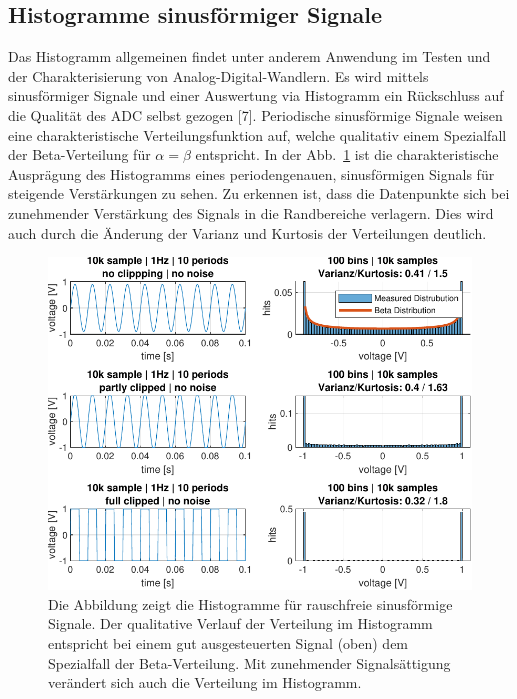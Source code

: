 \subsection{Histogramme sinusförmiger Signale }
Das Histogramm allgemeinen findet unter anderem Anwendung im Testen und der Charakterisierung von Analog-Digital-Wandlern. Es wird mittels sinusförmiger Signale und einer Auswertung via Histogramm ein Rückschluss auf die Qualität des ADC selbst gezogen [7]. Periodische sinusförmige Signale weisen eine charakteristische Verteilungsfunktion auf, welche qualitativ einem Spezialfall der Beta-Verteilung für $\alpha = \beta$ entspricht. In der Abb.~\ref{fig:Histogramm-Gain} ist die charakteristische Ausprägung des Histogramms eines periodengenauen, sinusförmigen Signals für steigende Verstärkungen zu sehen. Zu erkennen ist, dass die Datenpunkte sich bei zunehmender Verstärkung des Signals in die Randbereiche verlagern. Dies wird auch durch die Änderung der Varianz und Kurtosis der Verteilungen deutlich.
\begin{figure}[h!] 
	\centering 
	\includegraphics[width=1\columnwidth]{../img/beta-distribution.pdf}
	\caption{Die Abbildung zeigt die Histogramme für rauschfreie sinusförmige Signale. Der qualitative Verlauf der Verteilung im Histogramm entspricht bei einem gut ausgesteuerten Signal (oben) dem Spezialfall der Beta-Verteilung. Mit zunehmender Signalsättigung verändert sich auch die Verteilung im Histogramm.}
	\label{fig:Histogramm-Gain}
\end{figure} 
